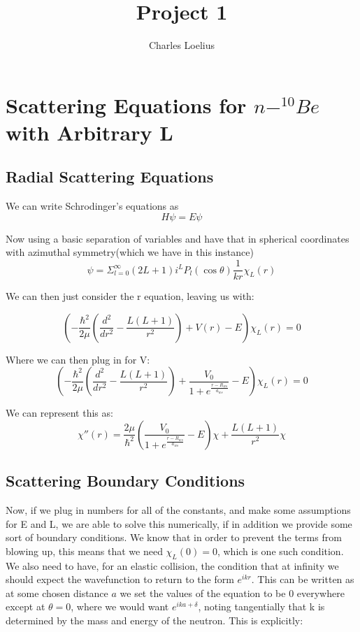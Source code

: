 \documentclass[11pt]{article} %
\title{Project 1}
\author{Charles Loelius}
\begin{document}
\maketitle

\section{Scattering Equations for  $n-^{10}Be $ with Arbitrary L}
\subsection{Radial Scattering Equations}
We can write Schrodinger's equations as 
\begin{equation}
H\psi=E\psi
\end{equation}

Now using a basic separation of variables and have that in spherical coordinates with azimuthal symmetry(which we have in this instance)\\

\begin{equation}
\psi=\Sigma_{l=0}^\infty (2L+1)i^LP_l(\cos\theta)\frac{1}{kr}\chi_L(r)
\end{equation}

We can then just consider the r equation, leaving us with:

\begin{equation}
(-\frac{\hbar^2}{2\mu}(\frac{d^2}{dr^2}-\frac{L(L+1)}{r^2})+V(r)-E)\chi_L(r)=0
\end{equation}

Where we can then plug in for V:\\
\begin{equation}
(-\frac{\hbar^2}{2\mu}(\frac{d^2}{dr^2}-\frac{L(L+1)}{r^2})+\frac{V_0}{1+e^{\frac{r-R_{ws}}{a_{ws}}}}-E)\chi_L(r)=0
\end{equation}

We can represent this as:\\

\begin{equation}
\boxed{\chi''(r)=\frac{2\mu}{\hbar^2}(\frac{V_0}{1+e^{\frac{r-R_{ws}}{a_{ws}}}}-E)\chi+\frac{L(L+1)}{r^2}\chi}
\end{equation}
\subsection{Scattering Boundary Conditions}
Now, if we plug in numbers for all of the constants, and make some assumptions for E and L, we are able to solve this numerically, if in addition we provide some sort of boundary conditions. We know that in order to prevent the terms from blowing up, this means that we need $\chi_L(0)=0$, which is one such condition. We also need to have, for an elastic collision, the condition that at infinity we should expect the wavefunction to return to the form $e^{ikr}$. This can be written as at some chosen distance $a$ we set the values of the equation to be 0 everywhere except at $\theta=0$, where we would want $e^{ika+\delta}$, noting tangentially that k is determined by the mass and energy of the neutron. This is explicitly:\\
\end{document}
